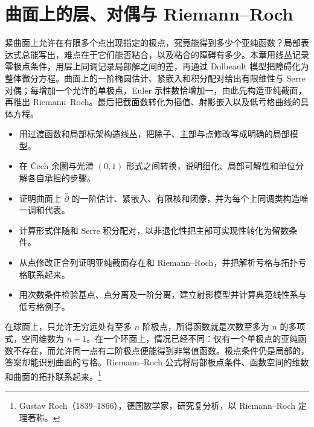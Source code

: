 
% 
% 

\chapter{曲面上的层、对偶与 Riemann–Roch}
\label{g4:ch:03}

\begin{chapterabstract}
	紧曲面上允许在有限多个点出现指定的极点，究竟能得到多少个亚纯函数？局部表达式总能写出，难点在于它们能否粘合，以及粘合的障碍有多少。本章用线丛记录零极点条件，用层上同调记录局部解之间的差，再通过 Dolbeault 模型把障碍化为整体微分方程。曲面上的一阶椭圆估计、紧嵌入和积分配对给出有限维性与 Serre 对偶；每增加一个允许的单极点，Euler 示性数恰增加一，由此先构造亚纯截面，再推出 Riemann--Roch。最后把截面数转化为插值、射影嵌入以及低亏格曲线的具体方程。
\end{chapterabstract}

\begin{learninggoals}
	\begin{itemize}
		\item 用过渡函数和局部标架构造线丛，把除子、主部与点修改写成明确的局部模型。
		\item 在 Čech 余圈与光滑 \((0,1)\) 形式之间转换，说明细化、局部可解性和单位分解各自承担的步骤。
		\item 证明曲面上 \(\bar\partial\) 的一阶估计、紧嵌入、有限核和闭像，并为每个上同调类构造唯一调和代表。
		\item 计算形式伴随和 Serre 积分配对，以非退化性把主部可实现性转化为留数条件。
		\item 从点修改正合列证明亚纯截面存在和 Riemann--Roch，并把解析亏格与拓扑亏格联系起来。
		\item 用次数条件检验基点、点分离及一阶分离，建立射影模型并计算典范线性系与低亏格例子。
	\end{itemize}
\end{learninggoals}

在球面上，只允许无穷远处有至多 \(n\) 阶极点，所得函数就是次数至多为 \(n\) 的多项式，空间维数为 \(n+1\)。在一个环面上，情况已经不同：仅有一个单极点的亚纯函数不存在，而允许同一点有二阶极点便能得到非常值函数。极点条件仍是局部的，答案却能识别曲面的亏格。Riemann--Roch 公式将局部极点条件、函数空间的维数和曲面的拓扑联系起来。\footnote{Gustav Roch（1839--1866），德国数学家，研究复分析，以 Riemann--Roch 定理著称。}

